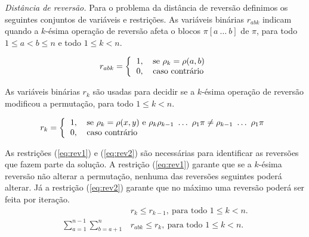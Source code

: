 \textit{Distância de reversão.}
Para o problema da distância de reversão definimos os seguintes
conjuntos de variáveis e restrições. As variáveis binárias $r_{abk}$
indicam quando a $k$-ésima operação de reversão afeta o blocos
$\pi[a~\ldots~b]$ de $\pi$, para todo $1 \le a < b \le n$ e todo
$1 \le k < n$.

\[
r_{abk} = \left \{ 
\begin{tabular}{ll} 
  1, & se $\rho_{k} = \rho(a,b)$ \\
  0, & caso contrário
\end{tabular} 
\right .
\]

As variáveis binárias $r_{k}$ são usadas para decidir se a $k$-ésima
operação de reversão modificou a permutação, para todo $ 1 \le k < n$.

\[
r_{k} = \left \{ 
\begin{tabular}{ll} 
 1, & se $\rho_{k} = \rho(x,y)$ e
 $\rho_{k} \rho_{k-1}~\ldots~\rho_{1} \pi \neq \rho_{k-1}~\ldots~\rho_{1} \pi$\\
 0, & caso contrário 
\end{tabular}
\right .
\]

As restrições (\ref{eq:rev1}) e (\ref{eq:rev2}) são necessárias para
identificar as reversões que fazem parte da solução. A restrição
(\ref{eq:rev1}) garante que se a $k$-ésima reversão não alterar a
permutação, nenhuma das reversões seguintes poderá alterar. Já a
restrição (\ref{eq:rev2}) garante que no máximo uma reversão poderá
ser feita por iteração.
\begin{align}
  &r_{k} \le r_{k-1},~\text{para todo $1 \le k <
  n$}. \label{eq:rev1} \\
  \sum_{a=1}^{n-1}\sum_{b=a+1}^{n}
  &r_{abk} \le r_{k},~\text{para todo $1 \le k < n$}. \label{eq:rev2}
\end{align}

